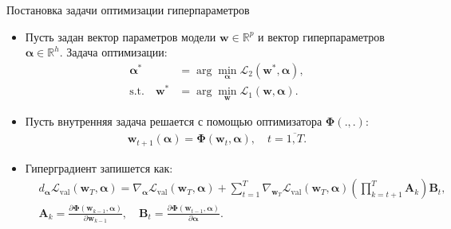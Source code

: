 \documentclass[aspectratio=169]{beamer}
\newcommand{\vect}[1]{\boldsymbol{\mathbf{#1}}}
\begin{document}
\begin{frame}{Постановка задачи оптимизации гиперпараметров}
\begin{itemize}
  \item Пусть задан вектор параметров модели $\mathbf{w} \in \mathbb{R}^p$ и вектор гиперпараметров
  $\boldsymbol{\alpha} \in \mathbb{R}^h$. Задача оптимизации:
  \begin{align*}
    \boldsymbol{\alpha}^* &= \arg\min_{\boldsymbol{\alpha}}\mathcal{L}_2(\mathbf{w}^*, \boldsymbol{\alpha}), \\
    \mathrm{s.t.} \quad \mathbf{w}^* &= \arg\min_{\mathbf{w}}\mathcal{L}_1(\mathbf{w}, \boldsymbol{\alpha}).
  \end{align*}
  \item Пусть внутренняя задача решается с помощью оптимизатора $\mathbf{\Phi}(., .)$:
  \begin{align*}
    \mathbf{w}_{t + 1}(\boldsymbol{\alpha}) = \mathbf{\Phi}(\mathbf{w}_t, \boldsymbol{\alpha}), \quad
    t = \overline{1, T}.
  \end{align*}
  \item Гиперградиент запишется как:
  \begin{align*}
    &d_{\vect{\alpha}}\mathcal{L}_\text{val}(\vect{w}_T, \vect{\alpha}) = \nabla_{\vect{\alpha}}\mathcal{L}_\text{val}(\vect{w}_T, \vect{\alpha}) + \sum_{t=1}^T \nabla_{\vect{w}_T}\mathcal{L}_\text{val}(\vect{w}_T, \vect{\alpha})\left(\prod_{k=t+1}^T\vect{A}_k\right)\vect{B}_t, \\
    &\vect{A}_k = \frac{\partial\vect{\Phi}(\vect{w}_{k-1}, \vect{\alpha})}{\partial\vect{w}_{k-1}}, \quad \vect{B}_t = \frac{\partial\vect{\Phi}(\vect{w}_{t-1}, \vect{\alpha})}{\partial\vect{\alpha}}.
\end{align*}
\end{itemize}
\end{frame}
\end{document}
